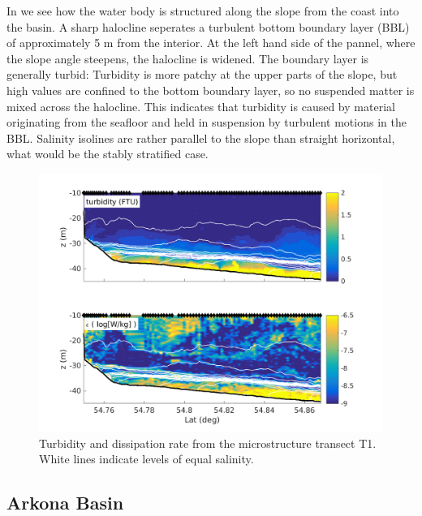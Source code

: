 In  we see how the water body is structured along the slope from 
the coast into the basin. A sharp halocline seperates a turbulent bottom 
boundary layer (BBL) of approximately 5 m from the interior. At the left hand 
side of the pannel, where the slope angle steepens, the halocline is widened. 
The boundary layer is generally turbid: Turbidity is more patchy at the upper 
parts of the slope, but high values are confined to the bottom boundary layer, 
so no suspended matter is mixed across the halocline. This indicates that 
turbidity is caused by material originating from the seafloor and held in 
suspension by turbulent motions in the BBL.
Salinity isolines are rather parallel to the slope than straight horizontal, 
what would be the stably stratified case.
  \begin{figure}[ht]
\includegraphics[width=40pc]{bilder/abtrans.png}
 \caption{Turbidity and dissipation rate from the microstructure transect T1. 
White lines indicate levels of equal salinity.}
 \label{transect}
 \end{figure}


\subsection{Arkona Basin}

